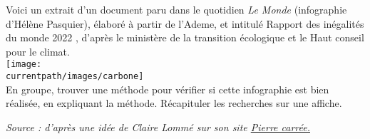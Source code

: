\begin{enigme}
     Voici un extrait d’un document paru dans le quotidien {\it Le Monde} (infographie d’Hélène Pasquier), élaboré à partir de l’Ademe, et intitulé \og Rapport des inégalités du monde 2022 \fg, d’après le ministère de la transition écologique et le Haut conseil pour le climat. \\ [1mm] 
   \texttt{[image: \\currentpath/images/carbone]} \\ [-3mm]
   
      En groupe, trouver une méthode pour vérifier si cette infographie est bien réalisée, en expliquant la méthode. Récapituler les recherches sur une affiche.
\end{enigme}
\vfill\hfill {\it\small Source : d'après une idée de Claire Lommé sur son site \href{https://clairelommeblog.wordpress.com/category/maths-et-societe}{Pierre carrée.}}

